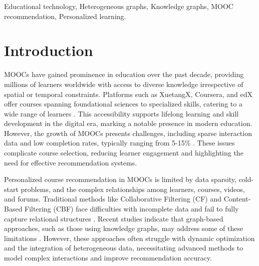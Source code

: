 \documentclass{ieeeaccess}
\begin{document}
\begin{keywords}
Educational technology, Heterogeneous graphs, Knowledge graphs, MOOC recommendation, Personalized learning.
\end{keywords}

\titlepgskip=-21pt

\maketitle

\section{Introduction}
\label{sec:introduction}
MOOCs have gained prominence in education over the past decade, providing millions of learners worldwide with access to diverse knowledge irrespective of spatial or temporal constraints. Platforms such as XuetangX, Coursera, and edX offer courses spanning foundational sciences to specialized skills, catering to a wide range of learners \cite{qaffas2020towards}. This accessibility supports lifelong learning and skill development in the digital era, marking a notable presence in modern education. However, the growth of MOOCs presents challenges, including sparse interaction data and low completion rates, typically ranging from 5-15\% \cite{jordan2014initial_trend_mooc}. These issues complicate course selection, reducing learner engagement and highlighting the need for effective recommendation systems.

Personalized course recommendation in MOOCs is limited by data sparsity, cold-start problems, and the complex relationships among learners, courses, videos, and forums. Traditional methods like Collaborative Filtering (CF) and Content-Based Filtering (CBF) face difficulties with incomplete data and fail to fully capture relational structures \cite{mustafeez2024comprehensive}. Recent studies indicate that graph-based approaches, such as those using knowledge graphs, may address some of these limitations \cite{wang2019kgat}. However, these approaches often struggle with dynamic optimization and the integration of heterogeneous data, necessitating advanced methods to model complex interactions and improve recommendation accuracy.
\end{document}
